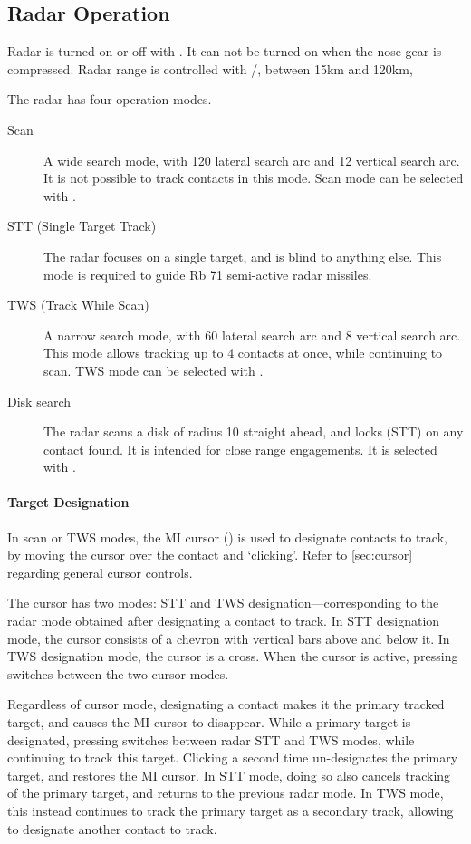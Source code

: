 \subsection{Radar Operation}
Radar is turned on or off with .
It can not be turned on when the nose gear is compressed.
Radar range is controlled with \keys{[}/\keys{]}, between 15km and 120km,

The radar has four operation modes.
\begin{description}
  \item[Scan] A wide search mode, with 120\textdegree{} lateral search arc and 12\textdegree{} vertical search arc.
    It is not possible to track contacts in this mode.
    Scan mode can be selected with .
  \item[STT (Single Target Track)] The radar focuses on a single target, and is blind to anything else.
    This mode is required to guide Rb 71 semi-active radar missiles.
  \item[TWS (Track While Scan)] A narrow search mode, with 60\textdegree{} lateral search arc and 8\textdegree{} vertical search arc.
    This mode allows tracking up to 4 contacts at once, while continuing to scan.
    TWS mode can be selected with .
  \item[Disk search] The radar scans a disk of radius 10\textdegree{} straight ahead,
    and locks (STT) on any contact found. It is intended for close range engagements.
    It is selected with .
\end{description}

\paragraph{Target Designation}
In scan or TWS modes, the MI cursor ()
is used to designate contacts to track, by moving the cursor over the contact and `clicking'.
Refer to \cref{sec:cursor} regarding general cursor controls.

The cursor has two modes: STT and TWS designation---corresponding to the radar mode
obtained after designating a contact to track.
In STT designation mode, the cursor consists of a chevron with vertical bars above and below it.
In TWS designation mode, the cursor is a cross.
When the cursor is active, pressing  switches between the two cursor modes.

Regardless of cursor mode, designating a contact makes it the primary tracked target,
and causes the MI cursor to disappear.
While a primary target is designated, pressing  switches
between radar STT and TWS modes, while continuing to track this target.
Clicking a second time un-designates the primary target, and restores the MI cursor.
In STT mode, doing so also cancels tracking of the primary target, and returns to the previous radar mode.
In TWS mode, this instead continues to track the primary target as a secondary track,
allowing to designate another contact to track.

